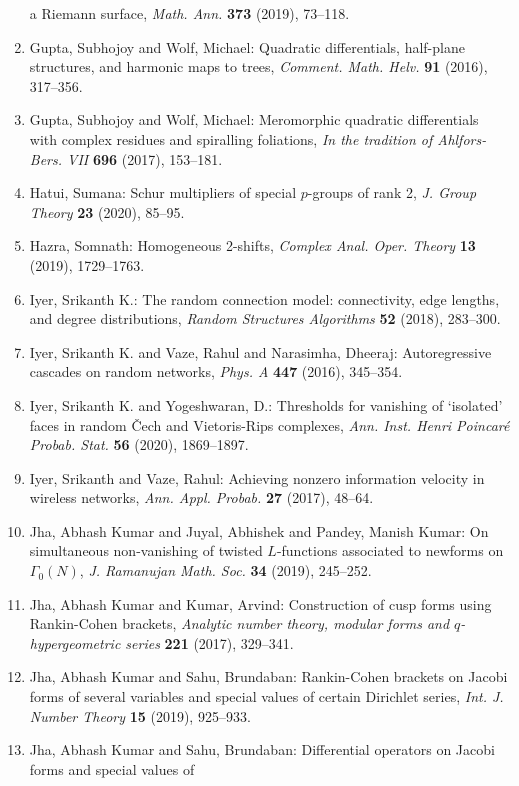 \begin{enumerate}
a {R}iemann surface, \emph{Math. Ann.} {\bf 373} (2019), 73--118.
\item Gupta, Subhojoy and Wolf, Michael: Quadratic differentials, half-plane structures, and harmonic
maps to trees, \emph{Comment. Math. Helv.} {\bf 91} (2016), 317--356.
\item Gupta, Subhojoy and Wolf, Michael: Meromorphic quadratic differentials with complex residues and
spiralling foliations, \emph{In the tradition of {A}hlfors-{B}ers. {VII}} {\bf 696} (2017), 153--181.
\item Hatui, Sumana: Schur multipliers of special {$p$}-groups of rank 2, \emph{J. Group Theory} {\bf 23} (2020), 85--95.
\item Hazra, Somnath: Homogeneous 2-shifts, \emph{Complex Anal. Oper. Theory} {\bf 13} (2019), 1729--1763.
\item Iyer, Srikanth K.: The random connection model: connectivity, edge lengths, and
degree distributions, \emph{Random Structures Algorithms} {\bf 52} (2018), 283--300.
\item Iyer, Srikanth K. and Vaze, Rahul and Narasimha, Dheeraj: Autoregressive cascades on random networks, \emph{Phys. A} {\bf 447} (2016), 345--354.
\item Iyer, Srikanth K. and Yogeshwaran, D.: Thresholds for vanishing of `isolated' faces in random \v{C}ech
and {V}ietoris-{R}ips complexes, \emph{Ann. Inst. Henri Poincar\'{e} Probab. Stat.} {\bf 56} (2020), 1869--1897.
\item Iyer, Srikanth and Vaze, Rahul: Achieving nonzero information velocity in wireless networks, \emph{Ann. Appl. Probab.} {\bf 27} (2017), 48--64.
\item Jha, Abhash Kumar and Juyal, Abhishek and Pandey, Manish
Kumar: On simultaneous non-vanishing of twisted {$L$}-functions
associated to newforms on {$\Gamma_0(N)$}, \emph{J. Ramanujan Math. Soc.} {\bf 34} (2019), 245--252.
\item Jha, Abhash Kumar and Kumar, Arvind: Construction of cusp forms using {R}ankin-{C}ohen brackets, \emph{Analytic number theory, modular forms and {$q$}-hypergeometric
series} {\bf 221} (2017), 329--341.
\item Jha, Abhash Kumar and Sahu, Brundaban: Rankin-{C}ohen brackets on {J}acobi forms of several variables
and special values of certain {D}irichlet series, \emph{Int. J. Number Theory} {\bf 15} (2019), 925--933.
\item Jha, Abhash Kumar and Sahu, Brundaban: Differential operators on {J}acobi forms and special values of

\end{enumerate}
